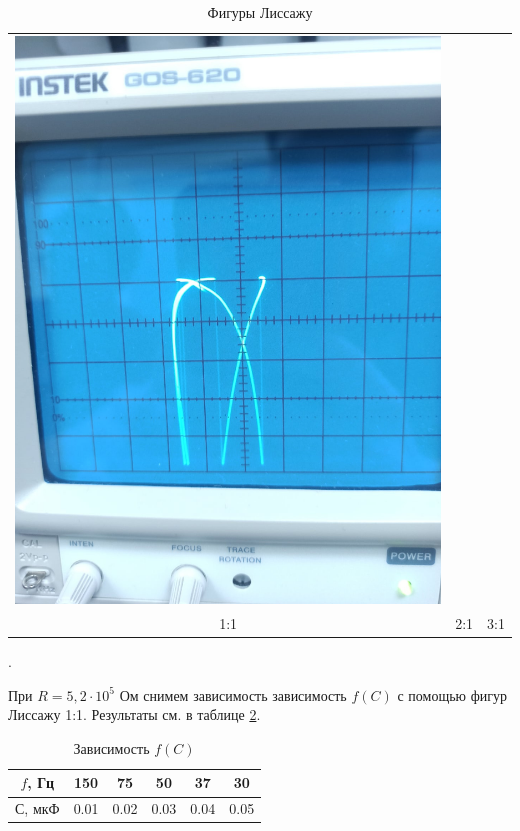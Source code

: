 \documentclass[a4paper, 12pt]{article}
\newcounter{Points}
\newcommand{\point}{\arabic{Points}. \addtocounter{Points}{1}}
\begin{document}
\begin{table}[!h]
\begin{tabular}{ccc}
        \includegraphics[scale = 0.1]{2int} \\
        1:1 &
        2:1 &
        3:1
    \end{tabular}
    \caption {Фигуры Лиссажу}
    \label {liss}
\end{table}

\point При $R = 5,2 \cdot 10^5$ Ом снимем зависимость зависимость $f (C)$ с помощью фигур Лиссажу 1:1. Результаты см. в таблице \ref{fC}.

\begin{table}[!h]
    \centering
    \begin{tabular}{|c|c|c|c|c|c|}
        \hline
        $f$, Гц & 150 & 75 & 50 & 37 & 30\\ \hline
        $С$, мкФ & 0.01 & 0.02 & 0.03 & 0.04 & 0.05
        \\ \hline
    \end{tabular}
    \caption {Зависимость $f (C)$}
    \label{fC}
\end{table}
\end{document}
